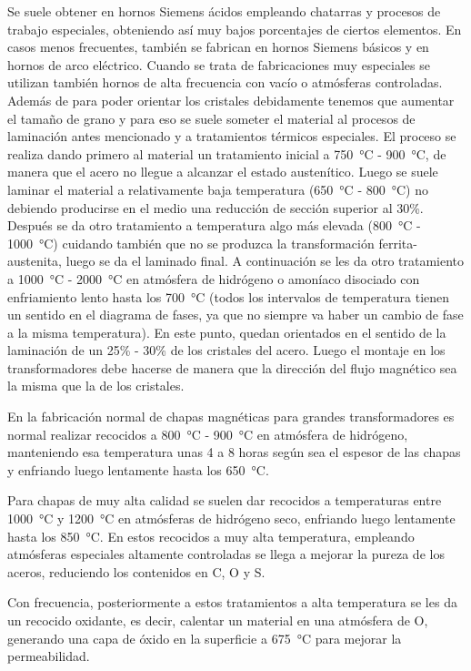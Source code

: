 \documentclass[12pt,a4paper]{article}
\begin{document}
Se suele obtener en hornos Siemens ácidos empleando chatarras y procesos de trabajo especiales, obteniendo así muy bajos porcentajes de ciertos elementos. En casos menos frecuentes, también se fabrican en hornos Siemens básicos y en hornos de arco eléctrico. Cuando se trata de fabricaciones muy especiales se utilizan también hornos de alta frecuencia con vacío o atmósferas controladas.
Además de para poder orientar los cristales debidamente tenemos que aumentar el tamaño de grano y para eso se suele someter el material al procesos de laminación antes mencionado y a tratamientos térmicos especiales. El proceso se realiza dando primero al material un tratamiento inicial a \SI{750}{\celsius} - \SI{900}{\celsius}, de manera que el acero no llegue a alcanzar el estado austenítico. Luego se suele laminar el material a relativamente baja temperatura (\SI{650}{\celsius} - \SI{800}{\celsius}) no debiendo producirse en el medio una reducción de sección superior al 30\%. Después se da otro tratamiento a temperatura algo más elevada (\SI{800}{\celsius} - \SI{1000}{\celsius}) cuidando también que no se produzca la transformación ferrita-austenita, luego se da el laminado final. A continuación se les da otro tratamiento a \SI{1 000}{\celsius} - \SI{2 000}{\celsius} en atmósfera de hidrógeno o amoníaco disociado con enfriamiento lento hasta los \SI{700}{\celsius} (todos los intervalos de temperatura tienen un sentido en el diagrama de fases, ya que no siempre va haber un cambio de fase a la misma temperatura). En este punto, quedan orientados en el sentido de la laminación de un 25\% - 30\% de los cristales del acero. Luego el montaje en los transformadores debe hacerse de manera que la dirección del flujo magnético sea la misma que la de los cristales.

En la fabricación normal de chapas magnéticas para grandes transformadores es normal realizar recocidos a \SI{800}{\celsius} - \SI{900}{\celsius} en atmósfera de hidrógeno, manteniendo esa temperatura unas 4 a 8 horas según sea el espesor de las chapas y enfriando luego lentamente hasta los \SI{650}{\celsius}.

Para chapas de muy alta calidad se suelen dar recocidos a temperaturas entre \SI{1 000}{\celsius} y \SI{1 200}{\celsius} en atmósferas de hidrógeno seco, enfriando luego lentamente hasta los \SI{850}{\celsius}. En estos recocidos a muy alta temperatura, empleando atmósferas especiales altamente controladas se llega a mejorar la pureza de los aceros, reduciendo los contenidos en C, O y S.

Con frecuencia, posteriormente a estos tratamientos a alta temperatura se les da un recocido oxidante, es decir, calentar un material en una atmósfera de O, generando una capa de óxido en la superficie a \SI{675}{\celsius} para mejorar la permeabilidad.
\end{document}
